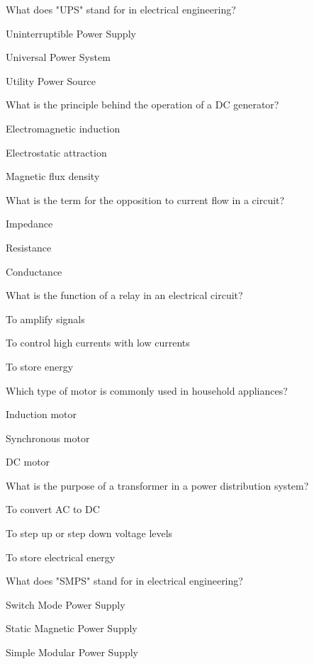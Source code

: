 \begin{enhancedmcq}{What does "UPS" stand for in electrical engineering?}
\item Uninterruptible Power Supply
\item Universal Power System
\item Utility Power Source

\end{enhancedmcq}
\begin{enhancedmcq}{What is the principle behind the operation of a DC generator?}
\item Electromagnetic induction
\item Electrostatic attraction
\item Magnetic flux density

\end{enhancedmcq}
\begin{enhancedmcq}{What is the term for the opposition to current flow in a circuit?}
\item Impedance
\item Resistance
\item Conductance

\end{enhancedmcq}
\begin{enhancedmcq}{What is the function of a relay in an electrical circuit?}
\item To amplify signals
\item To control high currents with low currents
\item To store energy

\end{enhancedmcq}
\begin{enhancedmcq}{Which type of motor is commonly used in household appliances?}
\item Induction motor
\item Synchronous motor
\item DC motor

\end{enhancedmcq}
\begin{enhancedmcq}{What is the purpose of a transformer in a power distribution system?}
\item To convert AC to DC
\item To step up or step down voltage levels
\item To store electrical energy

\end{enhancedmcq}
\begin{enhancedmcq}{What does "SMPS" stand for in electrical engineering?}
\item Switch Mode Power Supply
\item Static Magnetic Power Supply
\item Simple Modular Power Supply

\end{enhancedmcq}
